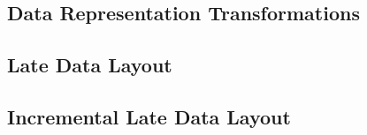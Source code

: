 \subsection{Data Representation Transformations}







\subsection {Late Data Layout}








\subsection{Incremental Late Data Layout}




